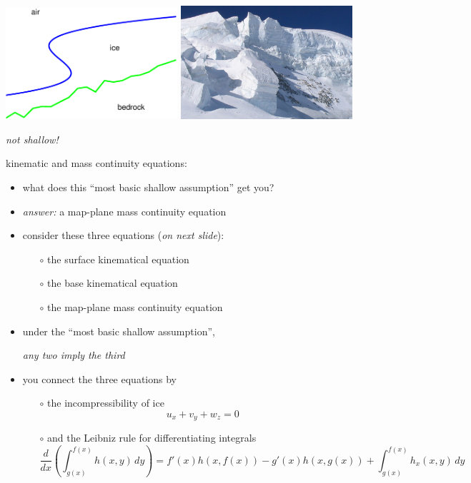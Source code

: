 \documentclass[titlepage,letterpaper,final,11pt]{scrartcl}
\newcommand{\alert}[1]{\emph{#1}}
\begin{document}
\begin{center}
\includegraphics[width=2.5in]{sshape}
\quad
\includegraphics[width=2.5in]{Serac2}

\alert{not shallow!}
\end{center}


kinematic and mass continuity equations:

\begin{itemize}
\item what does this ``most basic shallow assumption'' get you?
\item \emph{answer:} a map-plane mass continuity equation
\item consider these three equations (\emph{on next slide}):
  \begin{itemize}
  \item[$\circ$]  the surface kinematical equation
  \item[$\circ$]  the base kinematical equation
  \item[$\circ$]  the map-plane mass continuity equation
  \end{itemize}
\item under the ``most basic shallow assumption'', 

\begin{center}\emph{any two imply the third}\end{center}
\item you connect the three equations by
  \begin{itemize}
  \item[$\circ$]  the incompressibility of ice
    $$u_x + v_y + w_z = 0$$
  \item[$\circ$]  and the Leibniz rule for differentiating integrals
  \scriptsize
    $$\frac{d}{dx}\left(\int_{g(x)}^{f(x)} h(x,y)\,dy\right) = f'(x) h(x,f(x)) - g'(x) h(x,g(x)) + \int_{g(x)}^{f(x)} h_x(x,y)\,dy$$
  \end{itemize}
\end{itemize}
\end{document}
